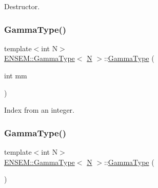 Destructor. 

\mbox{\label{classENSEM_1_1GammaType_ab93a83aeee6b442968d78f30cb6b4a65}} 
\subsubsection{\texorpdfstring{GammaType()}{GammaType()}\hspace{0.1cm}{\footnotesize\ttfamily [2/6]}}
{\footnotesize\ttfamily template$<$int N$>$ \\
\mbox{\hyperlink{classENSEM_1_1GammaType}{E\+N\+S\+E\+M\+::\+Gamma\+Type}}$<$ \mbox{\hyperlink{adat__devel_2lib_2hadron_2operator__name__util_8cc_a7722c8ecbb62d99aee7ce68b1752f337}{N}} $>$\+::\mbox{\hyperlink{classENSEM_1_1GammaType}{Gamma\+Type}} (\begin{DoxyParamCaption}\item[{int}]{mm }\end{DoxyParamCaption})\hspace{0.3cm}{\ttfamily [inline]}}



Index from an integer. 

\mbox{\label{classENSEM_1_1GammaType_a40badc5d1ed98704d66277e171adb121}} 
\subsubsection{\texorpdfstring{GammaType()}{GammaType()}\hspace{0.1cm}{\footnotesize\ttfamily [3/6]}}
{\footnotesize\ttfamily template$<$int N$>$ \\
\mbox{\hyperlink{classENSEM_1_1GammaType}{E\+N\+S\+E\+M\+::\+Gamma\+Type}}$<$ \mbox{\hyperlink{adat__devel_2lib_2hadron_2operator__name__util_8cc_a7722c8ecbb62d99aee7ce68b1752f337}{N}} $>$\+::\mbox{\hyperlink{classENSEM_1_1GammaType}{Gamma\+Type}} (\begin{DoxyParamCaption}{ }\end{DoxyParamCaption})\hspace{0.3cm}{\ttfamily [inline]}}



